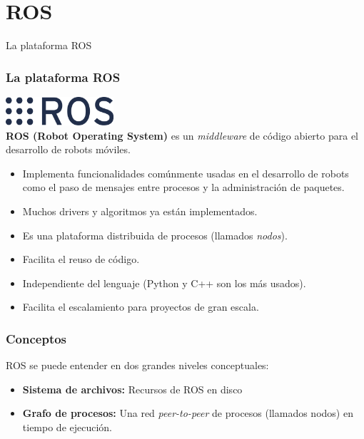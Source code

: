 \section{ROS}

\begin{frame}
  \Huge
  La plataforma ROS
\end{frame}


\begin{frame}\frametitle{La plataforma ROS}
  \includegraphics[width=0.3\textwidth]{Figures/Ros_logo.png}
  \[\]
  \textbf{ROS (Robot Operating System) } es un \textit{middleware} de código abierto para el desarrollo de robots móviles.
  \begin{itemize}
  \item Implementa funcionalidades comúnmente usadas en el desarrollo de robots como el paso de mensajes entre procesos y la administración de paquetes.
  \item Muchos drivers y algoritmos ya están implementados.
  \item Es una plataforma distribuida de procesos (llamados \textit{nodos}).
  \item Facilita el reuso de código.
  \item Independiente del lenguaje (Python y C++ son los más usados).
  \item Facilita el escalamiento para proyectos de gran escala. 
  \end{itemize}
\end{frame}

\begin{frame}\frametitle{Conceptos}
  ROS se puede entender en dos grandes niveles conceptuales:
  \begin{itemize}
  \item \textbf{Sistema de archivos:} Recursos de ROS en disco
  \item \textbf{Grafo de procesos:} Una red \textit{peer-to-peer} de procesos (llamados nodos) en tiempo de ejecución.
  \end{itemize}
\end{frame}

